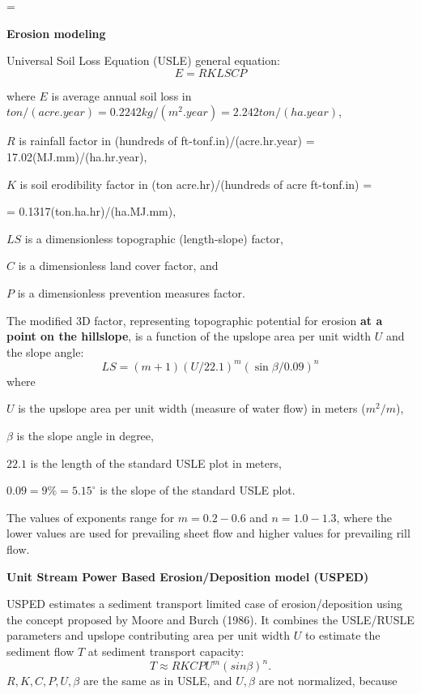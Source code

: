 \magnification=
\baselineskip=0.68cm
\hsize=5.4in
\def\und{\underbar}
\def\sp{\scriptstyle}
\def\spp{\scriptscriptstyle}
\def\tabrule{\noalign{\vskip 5truept \hrule\vskip 5truept} }
\def\tabrul2{\noalign{\vskip 5truept \hrule\vskip 2truept \hrule\vskip 5truept} }
\def\fbb {~\bar{\kern-0.325em \bar f}}
\def\bnabla{\mb \nabla}

\centerline {\bf Erosion modeling}
Universal Soil Loss Equation (USLE) general equation:
$$
E = R K L S C P
$$

\noindent
where 
$E$ is average annual soil loss in $ton/(acre.year)=0.2242kg/(m^2.year)=2.242ton/(ha.year)$, 

\noindent
$R$ is rainfall factor in (hundreds of ft-tonf.in)/(acre.hr.year) = 17.02(MJ.mm)/(ha.hr.year),

\noindent
$K$ is soil erodibility factor in (ton acre.hr)/(hundreds of acre ft-tonf.in) = 

\noindent
= 0.1317(ton.ha.hr)/(ha.MJ.mm),

\noindent
$LS$ is a dimensionless topographic (length-slope) factor,

\noindent
$C$ is a dimensionless land cover factor, and

\noindent
$P$ is a dimensionless prevention measures factor.

\noindent
The modified  3D factor, representing topographic potential
for erosion {\bf at a point on the hillslope}, is
a function of the upslope area per unit width $U$ and the slope angle:
$$
LS=(m+1) \left(U/22.1\right)^m \left({\sin{\beta}}/{0.09}\right)^n
$$
\noindent
where 

\noindent
$U$ is the upslope area per unit width (measure of water flow) in meters ($m^2/m$), 

\noindent
$\beta$ is the slope angle in degree, 

\noindent
$22.1$ is the length of the standard USLE plot in meters, 

\noindent
$0.09 = 9\% = 5.15^{\circ}$ is the slope of the standard USLE plot. 

\noindent
The values of exponents range for $m=0.2-0.6$ and
$n=1.0-1.3$, where the lower values are used for prevailing sheet flow and
higher values for prevailing rill flow.  

\smallskip
{\bf Unit Stream Power Based Erosion/Deposition model (USPED)}

\noindent
 USPED estimates a sediment transport limited case of erosion/deposition 
using the concept proposed by Moore and Burch (1986). 
It combines the USLE/RUSLE parameters
and upslope contributing area per unit width $U$ to estimate the
sediment flow $T$ at sediment transport capacity:
$$
 T \approx R K C P U^m (sin \beta)^n.
$$
\noindent
$R, K, C, P, U, \beta$ are the same as in USLE,
and $U, \beta$ are not normalized, because 

